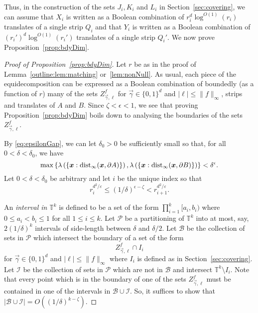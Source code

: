 \documentclass[12pt,a4paper]{amsart}
\numberwithin{equation}{section}
\theoremstyle{definition}
\begin{document}
Thus, in the construction of the sets $J_i,K_i$ and $L_i$ in Section~\ref{sec:covering}, we can assume that $X_i$ is written as a Boolean combination of $r_i^d\log^{O(1)}(r_i)$  translates of a single strip $Q_i$ and that $Y_i$ is written as a Boolean combination of $(r_i')^d\log^{O(1)}(r_i')$ translates of a single strip $Q_i'$. We now prove Proposition~\ref{prop:bdyDim}.

\begin{proof}[Proof of Proposition~\ref{prop:bdyDim}]
Let $r$ be as in the proof of Lemma~\ref{outline:lem:matching} or~\ref{lem:nonNull}. As usual, each piece of the equidecomposition can be expressed as a Boolean combination of boundedly (as a function of $r$) many of the sets $Z_{\vec{\gamma},\ell}^f$ for $\vec{\gamma}\in\{0,1\}^d$ and $|\ell|\leq \|f\|_\infty$, strips and translates of $A$ and $B$. Since $\zeta<\epsilon<1$, we see that proving Proposition~\ref{prop:bdyDim} boils down to analysing the boundaries of the sets $Z_{\vec{\gamma},\ell}^f$. 

By \eqref{eq:epsilonGap}, we can let $\delta_0>0$ be sufficiently small so that, for all $0 < \delta < \delta_0$, we have
\[\max\left\{\lambda\left(\left\{\boldsymbol{x}: \operatorname{dist}_\infty(\boldsymbol{x},\partial A)\right\}\right),\lambda\left(\left\{\boldsymbol{x}: \operatorname{dist}_\infty(\boldsymbol{x},\partial B)\right\}\right)\right\}< \delta^{\epsilon}.\]
Let $0<\delta<\delta_0$ be arbitrary and let $i$ be the unique index so that
\begin{equation}\label{eq:riChoice}r_i^{d^2/\varepsilon}\leq \left(1/\delta\right)^{\epsilon-\zeta} < r_{i+1}^{d^2/\varepsilon}.\end{equation}

An \emph{interval in} $\mathbb{T}^k$ is defined to be a set of the form $\prod_{i=1}^k[a_i,b_i)$ where $0\leq a_i<b_i\leq 1$ for all $1\leq i\leq k$. Let $\mathcal{P}$ be a partitioning of $\mathbb{T}^k$ into at most, say, $2(1/\delta)^k$ intervals of side-length between $\delta$ and $\delta/2$. Let $\mathcal{B}$ be the collection of sets in $\mathcal{P}$ which intersect the boundary of a set of the form
\[Z_{\vec{\gamma},\ell}^f\cap I_i\]
for $\vec{\gamma}\in\{0,1\}^d$ and $|\ell|\leq \|f\|_\infty$ where $I_i$ is defined as in Section~\ref{sec:covering}. Let $\mathcal{I}$ be the collection of sets in $\mathcal{P}$ which are not in $\mathcal{B}$ and intersect $\mathbb{T}^k\setminus I_i$. Note that every point which is in the boundary of one of the sets $Z_{\vec{\gamma},\ell}^f$ must be contained in one of the intervals in $\mathcal{B}\cup\mathcal{I}$. So, it suffices to show that $|\mathcal{B}\cup\mathcal{I}|=O\left((1/\delta)^{k-\zeta}\right)$.


\end{proof}
\end{document}
